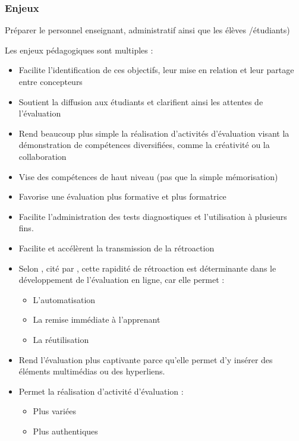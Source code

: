 \documentclass[aspectratio=169]{beamer}
\begin{document}
			\begin{frame}[allowframebreaks]
				  \frametitle{Enjeux}
				
				 
				 \begin{description}
					\item [Aisance TIC] \par Préparer le personnel enseignant, administratif ainsi que les élèves /étudiants)\citep{NorthCarolina2013}
					\item[Pédagogiques] Les enjeux pédagogiques sont multiples : 
					 	\begin{itemize}
					 		\item Facilite l'identification de ces objectifs, leur mise en relation et leur partage entre concepteurs          
							\item Soutient la diffusion aux étudiants et clarifient ainsi les attentes de l'évaluation
							\item Rend beaucoup plus simple la réalisation d'activités d'évaluation visant la démonstration de compétences diversifiées, comme la créativité ou la collaboration
							\item Vise des compétences de haut niveau (pas que la simple mémorisation)
							\item Favorise une évaluation plus formative et plus formatrice
							\item Facilite l'administration des tests diagnostiques et l'utilisation à plusieurs fins.					
							\item Facilite et accélèrent la transmission de la rétroaction
							\item Selon \citet{whitelock2006a}, cité par \citet{audet2011a}, cette rapidité de rétroaction est déterminante dans le développement de l'évaluation en ligne, car elle permet :
					 		\begin {itemize}
									\item L'automatisation
									\item La remise immédiate à l'apprenant
									\item La réutilisation
							\end{itemize}
							\item Rend l'évaluation plus captivante parce qu'elle permet d'y insérer des éléments multimédias ou des hyperliens.
						\item Permet la réalisation d'activité d'évaluation :
								\begin {itemize}
									\item Plus variées
									\item Plus authentiques

\end{itemize}
\end{itemize}
\end{description}
\end{frame}
\end{document}
